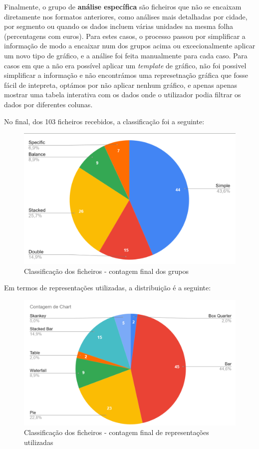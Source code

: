 Finalmente, o grupo de \textbf{análise específica} são ficheiros que não se encaixam diretamente nos formatos anteriores, como análises mais detalhadas por cidade, por segmento ou quando os dados incluem várias unidades na mesma folha (percentagens com euros). Para estes casos, o processo passou por simplificar a informação de modo a encaixar num dos grupos acima ou excecionalmente aplicar um novo tipo de gráfico, e a análise foi feita manualmente para cada caso. Para casos em que a não era possível aplicar um \textit{template} de gráfico, não foi possivel simplificar a informação e não encontrámos uma represetnação gráfica que fosse fácil de intepreta, optámos por não aplicar nenhum gráfico, e apenas apenas mostrar uma tabela interativa com os dados onde o utilizador podia filtrar os dados por diferentes colunas.


No final, dos 103 ficheiros recebidos, a classificação foi a seguinte:
\begin{figure}[h]
    \centering
    \includegraphics[width=\textwidth]{./img/stats1}
 \caption{Classificação dos ficheiros - contagem final dos grupos}
 \end{figure}

Em termos de representações utilizadas, a distribuição é a seguinte:
\begin{figure}[h]
    \centering
    \includegraphics[width=\textwidth]{./img/stats2}
 \caption{Classificação dos ficheiros - contagem final de representações utilizadas}
 \end{figure}

